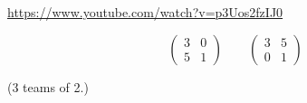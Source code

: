 \documentclass{beamer}
\begin{document}




    \begin{frame}
        \begin{center}
            \url{https://www.youtube.com/watch?v=p3Uos2fzIJ0}
        \end{center}
    \end{frame}

    \begin{frame}
        \Huge
        \[
            \begin{pmatrix}
                3 & 0\\
                5 & 1
            \end{pmatrix}
            \qquad
            \begin{pmatrix}
                3 & 5\\
                0 & 1
            \end{pmatrix}
        \]

        \pause
		\normalsize
        \begin{center}
            (3 teams of 2.)
        \end{center}
    \end{frame}
\end{document}
